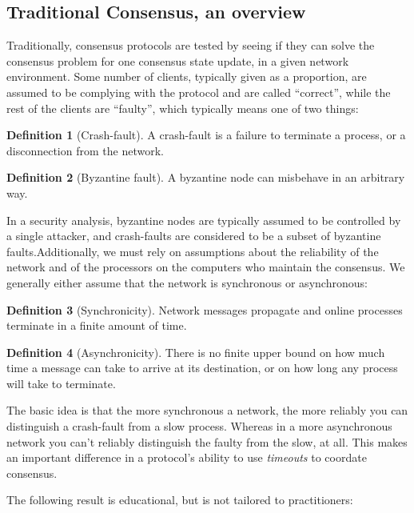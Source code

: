\documentclass[11pt,a4paper]{article}
\theoremstyle{plain}
\theoremstyle{definition}
\newtheorem{defn}{Definition}
\begin{document}
\subsection{Traditional Consensus, an overview}

Traditionally, consensus protocols are tested by seeing if they can solve the consensus problem for one consensus state update, in a given network environment. Some number of clients, typically given as a proportion, are assumed to be complying with the protocol and are called ``correct'', while the rest of the clients are ``faulty'', which typically means one of two things:

\begin{defn}[Crash-fault]
A crash-fault is a failure to terminate a process, or a disconnection from the network.
\end{defn}

\begin{defn}[Byzantine fault]
A byzantine node can misbehave in an arbitrary way. 
\end{defn}

In a security analysis, byzantine nodes are typically assumed to be controlled by a single attacker, and crash-faults are considered to be a subset of byzantine faults.Additionally, we must rely on assumptions about the reliability of the network and of the processors on the computers who maintain the consensus. We generally either assume that the network is synchronous or asynchronous: 

\begin{defn}[Synchronicity]
Network messages propagate and online processes terminate in a finite amount of time.
\end{defn}

\begin{defn}[Asynchronicity]
There is no finite upper bound on how much time a message can take to arrive at its destination, or on how long any process will take to terminate. 
\end{defn}

The basic idea is that the more synchronous a network, the more reliably you can distinguish a crash-fault from a slow process. Whereas in a more asynchronous network you can't reliably distinguish the faulty from the slow, at all. This makes an important difference in a protocol's ability to use \emph{timeouts} to coordate consensus. 

The following result is educational, but is not tailored to practitioners:
\end{document}
